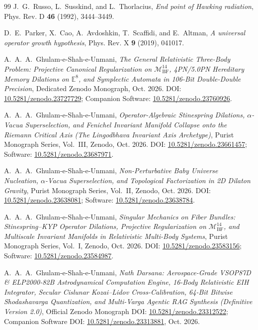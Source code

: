 \documentclass[11pt,a4paper,reqno]{article}
\theoremstyle{plain}
\theoremstyle{definition}
\theoremstyle{remark}
\numberwithin{equation}{section}
\begin{document}
\begin{thebibliography}{99}
J.~G.~Russo, L.~Susskind, and L.~Thorlacius,
\textit{End point of Hawking radiation},
Phys. Rev. D \textbf{46} (1992), 3444--3449.

D.~E.~Parker, X.~Cao, A.~Avdoshkin, T.~Scaffidi, and E.~Altman,
\textit{A universal operator growth hypothesis},
Phys. Rev. X \textbf{9} (2019), 041017.

A.~A.~A.~Ghulam-e-Shah-e-Unmani,
\textit{The General Relativistic Three-Body Problem: Projective Canonical Regularization on $\mathcal{M}_{\mathrm{BF}}^{14}$, 4PN/5.0PN Hereditary Memory Dilations on $\mathbb{E}^8$, and Symplectic Automata in 106-Bit Double-Double Precision},
Dedicated Zenodo Monograph, Oct. 2026. DOI: \href{https://doi.org/10.5281/zenodo.23727729}{10.5281/zenodo.23727729}; Companion Software: \href{https://doi.org/10.5281/zenodo.23760926}{10.5281/zenodo.23760926}.

A.~A.~A.~Ghulam-e-Shah-e-Unmani,
\textit{Operator-Algebraic Stinespring Dilations, $\alpha$-Vacua Superselection, and Fenichel Invariant Manifold Collapse onto the Riemann Critical Axis (The Lingodbhava Invariant Axis Archetype)},
Purist Monograph Series, Vol.~III, Zenodo, Oct. 2026. DOI: \href{https://doi.org/10.5281/zenodo.23661457}{10.5281/zenodo.23661457}; Software: \href{https://doi.org/10.5281/zenodo.23687971}{10.5281/zenodo.23687971}.

A.~A.~A.~Ghulam-e-Shah-e-Unmani,
\textit{Non-Perturbative Baby Universe Nucleation, $\alpha$-Vacua Superselection, and Topological Factorization in 2D Dilaton Gravity},
Purist Monograph Series, Vol.~II, Zenodo, Oct. 2026. DOI: \href{https://doi.org/10.5281/zenodo.23638081}{10.5281/zenodo.23638081}; Software: \href{https://doi.org/10.5281/zenodo.23638784}{10.5281/zenodo.23638784}.

A.~A.~A.~Ghulam-e-Shah-e-Unmani,
\textit{Singular Mechanics on Fiber Bundles: Stinespring--KYP Operator Dilations, Projective Regularization on $\mathcal{M}_{\mathrm{BF}}^{14}$, and Multiscale Invariant Manifolds in Relativistic Multi-Body Systems},
Purist Monograph Series, Vol.~I, Zenodo, Oct. 2026. DOI: \href{https://doi.org/10.5281/zenodo.23583156}{10.5281/zenodo.23583156}; Software: \href{https://doi.org/10.5281/zenodo.23584987}{10.5281/zenodo.23584987}.

A.~A.~A.~Ghulam-e-Shah-e-Unmani,
\textit{Nath Darsana: Aerospace-Grade VSOP87D \& ELP2000-82B Astrodynamical Computation Engine, 16-Body Relativistic EIH Integrator, Secular Cislunar Kozai--Lidov Cross-Calibration, 64-Bit Bitwise Shodashavarga Quantization, and Multi-Varga Agentic RAG Synthesis (Definitive Version 2.0)},
Official Zenodo Monograph DOI: \href{https://doi.org/10.5281/zenodo.23312522}{10.5281/zenodo.23312522}; Companion Software DOI: \href{https://doi.org/10.5281/zenodo.23313881}{10.5281/zenodo.23313881}, Oct. 2026.


\end{thebibliography}
\end{document}
